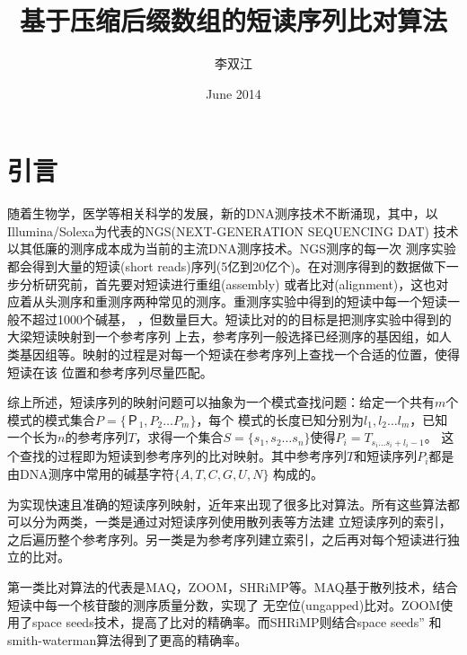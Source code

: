 \documentclass[UTF8,adobefonts]{ctexart}
\title{基于压缩后缀数组的短读序列比对算法}
\author{李双江}
\date{June 2014}
\begin{document}
\maketitle
{}

\section{引言}

随着生物学，医学等相关科学的发展，新的DNA测序技术不断涌现，其中，以Illumina/Solexa为代表的NGS(NEXT-GENERATION SEQUENCING DAT)
技术以其低廉的测序成本成为当前的主流DNA测序技术。NGS测序的每一次
测序实验都会得到大量的短读(short reads)序列(5亿到20亿个)。在对测序得到的数据做下一步分析研究前，首先要对短读进行重组(assembly)
或者比对(alignment)，这也对应着从头测序和重测序两种常见的测序。重测序实验中得到的短读中每一个短读一般不超过1000个碱基，
，但数量巨大。短读比对的的目标是把测序实验中得到的大梁短读映射到一个参考序列
上去，参考序列一般选择已经测序的基因组，如人类基因组等。映射的过程是对每一个短读在参考序列上查找一个合适的位置，使得短读在该
位置和参考序列尽量匹配。

综上所述，短读序列的映射问题可以抽象为一个模式查找问题：给定一个共有$m$个模式的模式集合$P=\{Ｐ_1,P_2\ldots P_m\}$，每个
模式的长度已知分别为$l_1,l_2\ldots l_m$，已知一个长为$n$的参考序列$T$，求得一个集合$S=\{s_1,s_2\ldots s_n\}$使得$P_i=T_{s_i\ldots s_i+l_i-1}$。
这个查找的过程即为短读到参考序列的比对映射。其中参考序列$T$和短读序列$P_i$都是由DNA测序中常用的碱基字符$\{A,T,C,G,U,N\}$
构成的。

为实现快速且准确的短读序列映射，近年来出现了很多比对算法。所有这些算法都可以分为两类，一类是通过对短读序列使用散列表等方法建
立短读序列的索引，之后遍历整个参考序列。另一类是为参考序列建立索引，之后再对每个短读进行独立的比对。

第一类比对算法的代表是MAQ，ZOOM，SHRiMP等。MAQ\cite{li2008mapping}基于散列技术，结合短读中每一个核苷酸的测序质量分数，实现了
无空位(ungapped)比对。ZOOM\cite{lin2008zoom}使用了space seeds技术，提高了比对的精确率。而SHRiMP\cite{rumble2009shrimp}则结合space seeds''
和smith-waterman算法得到了更高的精确率。
\end{document}
